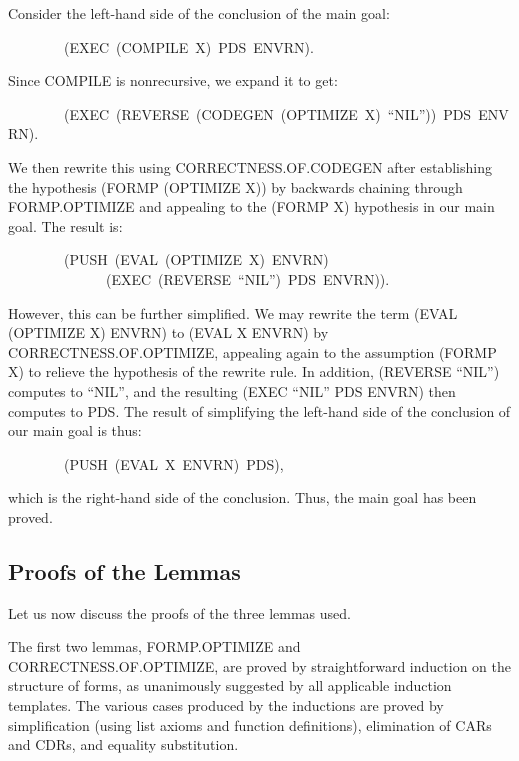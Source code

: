 \documentclass[11pt]{book}
\newenvironment{pubasis}{\begin{flushleft}\ttfamily\small}{\normalsize\rmfamily\end{flushleft}}
\newcommand{\pubdefaulttextsize}{\large}
\begin{document}
Consider the left-hand side of the conclusion of the main goal:
\begin{pubasis}
~~~~~~~~(EXEC~(COMPILE~X)~PDS~ENVRN).\\
\end{pubasis}
Since COMPILE is nonrecursive, we  expand it to get:
\begin{pubasis}
~~~~~~~~(EXEC~(REVERSE~(CODEGEN~(OPTIMIZE~X)~``NIL''))~PDS~ENVRN).\\
\end{pubasis}
We  then rewrite this using CORRECT\-NESS.OF.CODEGEN after establishing
the hypothesis (FORMP (OPTIMIZE X)) by backwards chaining through
FORMP.OPTIMIZE and appealing to the (FORMP X) hypothesis in our main goal.
The result is:
\begin{pubasis}
~~~~~~~~(PUSH~(EVAL~(OPTIMIZE~X)~ENVRN)\\
~~~~~~~~~~~~~~(EXEC~(REVERSE~``NIL'')~PDS~ENVRN)).\\
\end{pubasis}
However, this can be further simplified.  We may rewrite
the term (EVAL (OPTIMIZE X) ENVRN)
to (EVAL X ENVRN) by CORRECT\-NESS.OF.OPTIMIZE, appealing
again to the assumption (FORMP X) to relieve the hypothesis
of the rewrite rule.  In addition, (REVERSE ``NIL'') computes to ``NIL'',
and the resulting (EXEC ``NIL'' PDS ENVRN) then computes to PDS.
The result of simplifying the left-hand side of the conclusion of
our main goal is thus:
\begin{pubasis}
~~~~~~~~(PUSH~(EVAL~X~ENVRN)~PDS),\\
\end{pubasis}
which is the right-hand side of the conclusion.  Thus, the
main goal has been proved.
\subsection{Proofs of the Lemmas}
\pubdefaulttextsize
Let us now discuss the proofs of the three lemmas used.

The first two lemmas, FORMP.OPTIMIZE and CORRECT\-NESS.OF.OPTIMIZE, are proved by straightforward induction on the
structure of forms, as unanimously suggested by all applicable
induction templates.  The various cases produced by the inductions
are proved by simplification (using list axioms and function definitions),
elimination of CARs and CDRs, and equality substitution.
\end{document}

